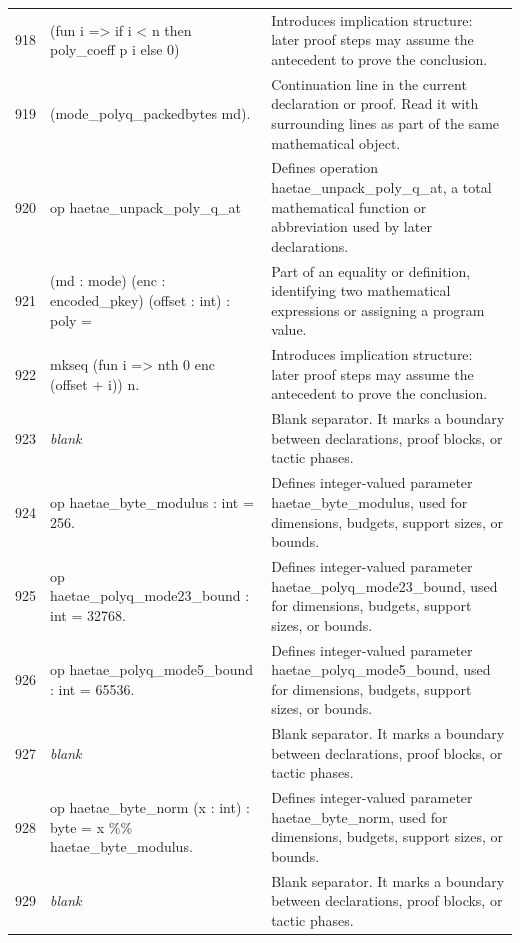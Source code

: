\documentclass[10pt]{article}
\begin{document}
\begin{longtable}{r L{0.53\textwidth} L{0.37\textwidth}}
918 & {\ttfamily\scriptsize     (fun i => if i < n then poly\_coeff p i else 0)} & Introduces implication structure: later proof steps may assume the antecedent to prove the conclusion. \\
919 & {\ttfamily\scriptsize     (mode\_polyq\_packedbytes md).} & Continuation line in the current declaration or proof.  Read it with surrounding lines as part of the same mathematical object. \\
920 & {\ttfamily\scriptsize op haetae\_unpack\_poly\_q\_at} & Defines operation haetae\_unpack\_poly\_q\_at, a total mathematical function or abbreviation used by later declarations. \\
921 & {\ttfamily\scriptsize    (md : mode) (enc : encoded\_pkey) (offset : int) : poly =} & Part of an equality or definition, identifying two mathematical expressions or assigning a program value. \\
922 & {\ttfamily\scriptsize   mkseq (fun i => nth 0 enc (offset + i)) n.} & Introduces implication structure: later proof steps may assume the antecedent to prove the conclusion. \\
923 & {\ttfamily\scriptsize \emph{blank}} & Blank separator.  It marks a boundary between declarations, proof blocks, or tactic phases. \\
924 & {\ttfamily\scriptsize op haetae\_byte\_modulus : int = 256.} & Defines integer-valued parameter haetae\_byte\_modulus, used for dimensions, budgets, support sizes, or bounds. \\
925 & {\ttfamily\scriptsize op haetae\_polyq\_mode23\_bound : int = 32768.} & Defines integer-valued parameter haetae\_polyq\_mode23\_bound, used for dimensions, budgets, support sizes, or bounds. \\
926 & {\ttfamily\scriptsize op haetae\_polyq\_mode5\_bound : int = 65536.} & Defines integer-valued parameter haetae\_polyq\_mode5\_bound, used for dimensions, budgets, support sizes, or bounds. \\
927 & {\ttfamily\scriptsize \emph{blank}} & Blank separator.  It marks a boundary between declarations, proof blocks, or tactic phases. \\
928 & {\ttfamily\scriptsize op haetae\_byte\_norm (x : int) : byte = x \%\% haetae\_byte\_modulus.} & Defines integer-valued parameter haetae\_byte\_norm, used for dimensions, budgets, support sizes, or bounds. \\
929 & {\ttfamily\scriptsize \emph{blank}} & Blank separator.  It marks a boundary between declarations, proof blocks, or tactic phases. \\

\end{longtable}
\end{document}
